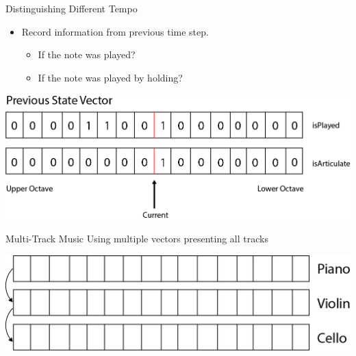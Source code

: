 \documentclass{beamer}
\begin{document}
\begin{frame}{Distinguishing Different Tempo}
  \begin{itemize}
    \item
    Record information from previous time step.
    \begin{itemize}
      \item If the note was played?
      \item If the note was played by holding?
    \end{itemize}
  \end{itemize}

  \includegraphics[scale=0.3]{previous_state.jpg}
\end{frame}

\begin{frame}{Multi-Track Music}
    Using multiple vectors presenting all tracks 
    \newline

    \includegraphics[scale=0.3]{multi-track.jpg}
\end{frame}
\end{document}
